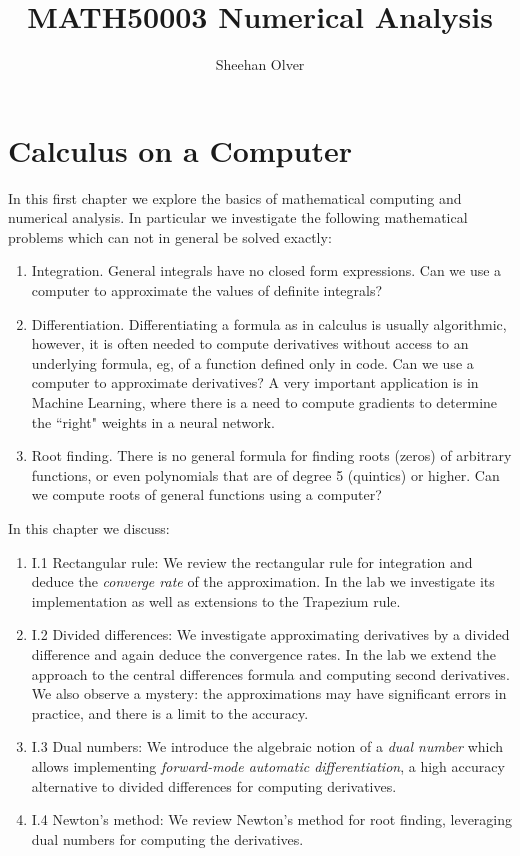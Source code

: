 \documentclass[12pt,a4paper]{book}
\title{ MATH50003 Numerical Analysis }
\author{ Sheehan Olver }
\theoremstyle{definition}
\begin{document}
\maketitle


\chapter{Calculus on a Computer}

In this first chapter we explore the basics of mathematical computing and numerical analysis.
In particular we investigate the following mathematical problems which can not in general be solved exactly:

\begin{enumerate}
\item Integration. General integrals have no closed form expressions. Can we use a computer to approximate the values of definite integrals?
\item Differentiation. Differentiating a formula as in calculus is usually algorithmic, however, it is often needed to compute derivatives without access to an underlying formula, eg, of a function defined only in code. Can we use a computer to approximate derivatives?  A very important application is in Machine Learning, where there is a need to compute gradients to determine the ``right" weights in a neural network. 
\item Root finding. There is no general formula for finding roots (zeros) of arbitrary functions, or even polynomials that are of degree 5 (quintics) or higher. Can we compute roots of general functions using a computer?
\end{enumerate}

In this chapter we discuss:

\begin{enumerate}
\item I.1 Rectangular rule: We review the rectangular rule for integration and deduce the {\it converge rate} of the approximation. In the lab  we investigate its implementation as well as extensions to the Trapezium rule. 
\item I.2 Divided differences: We investigate approximating derivatives by a divided difference and again deduce the convergence rates. In the lab we extend the approach to the central differences formula and computing second derivatives. We also observe a mystery: the approximations may have significant errors in practice, and there is a limit to the accuracy.
\item I.3 Dual numbers:  We introduce the algebraic notion of a {\it dual number} which allows implementing {\it forward-mode automatic differentiation}, a high accuracy alternative to divided differences for computing derivatives.
\item I.4 Newton's method: We review Newton's method for root finding, leveraging dual numbers for computing the derivatives.
\end{enumerate}






\end{document}
